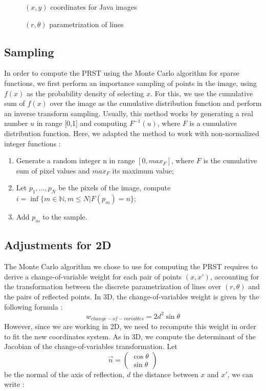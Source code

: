 \documentclass[10pt,a4paper]{article}			%
\begin{document}
\begin{figure}[h]

\caption{$(x,y)$ coordinates for Java images}
\label{coordinates}	
\end{figure}

\begin{figure}[h]	
	
\caption{$(r,\theta)$ parametrization of lines}
\label{lines_parametrization}
\end{figure}

	\subsection{Sampling}
In order to compute the PRST using the Monte Carlo algorithm for sparse functions, we first perform an importance sampling of points in the image, using $f(x)$  as the probability density of selecting $x$. For this, we use the cumulative sum of $f(x)$ over the image as the cumulative distribution function and perform an inverse transform sampling. Usually, this method works by generating a real number $u$ in range [0,1] and computing $F^{-1}(u)$, where $F$ is a cumulative distribution function. Here, we adapted the method to work with non-normalized integer functions :
\begin{enumerate}
\item Generate a random integer n in range $[0,max_F]$, where $F$ is the cumulative sum of pixel values and $max_F$ its maximum value;
\item Let $p_1,...,p_N$ be the pixels of the image, compute $i=\inf\{m\in \mathbb{N}, m\leq N |  F(p_m) = n\}$;
\item Add $p_m$ to the sample.
\end{enumerate}



	\subsection{Adjustments for 2D}
	

The Monte Carlo algorithm we chose to use for computing the PRST requires to derive a change-of-variable weight for each pair of points $(x,x')$, accounting for the transformation between the discrete parametrization of lines over $(r,\theta)$ and the pairs of reflected points. In 3D, the change-of-variables weight is given by the following formula :
\[w_{change-of-variables} = 2d^2\sin\theta\]
However, since we are working in 2D, we need to recompute this weight in order to fit the new coordinates system. As in 3D, we compute the determinant of the Jacobian of the change-of-variables transformation. Let 
\[\vec{n}=\begin{pmatrix}\cos\theta \\ \sin\theta\end{pmatrix}\]
be the normal of the axis of reflection, $d$ the distance between $x$ and $x'$, we can write :
\end{document}
